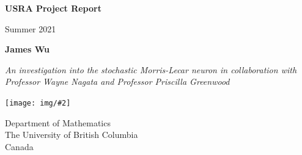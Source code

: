 \documentclass[letterpaper,12pt]{article}
\numberwithin{table}{section}
\numberwithin{figure}{section}
\numberwithin{equation}{section}
\newcommand{\centerfig}[2]{\begin{center}\texttt{[image: img/\#2]}\end{center}}
\begin{document}
\begin{titlepage}
    \begin{center}

        \vspace*{1cm}
            
        \Huge
        \textbf{USRA Project Report}
            
        \vspace{0.5cm}
        \LARGE
        Summer 2021
            
        \vspace{1.5cm}
            
        \textbf{James Wu}
            
        \vfill

        \Large
        
        \textit{An investigation into the stochastic Morris-Lecar neuron in collaboration with Professor Wayne Nagata and Professor Priscilla Greenwood}
            
        \vspace{0.8cm}
            
        \centerfig{0.25}{ubc.jpg}
            
        \Large
        Department of Mathematics \\
        The University of British Columbia \\
        Canada
            
    \end{center}
\end{titlepage}

\tableofcontents

\pagebreak
\end{document}
